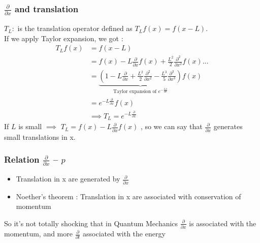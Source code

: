 \documentclass[12pt,oneside]{book}
\begin{document}
\subsubsection{$\frac{\partial }{\partial x}$ and translation}
$T_L :$ is the translation operator defined as $T_Lf(x) = f(x-L)$.\\
If we apply Taylor expansion, we got :\\
\begin{align*}
	T_Lf(x) & = f(x-L)                                                                                                                                                                                                        \\
	        & =f(x) - L\frac{\partial}{\partial x}f(x)+ \frac{L^2}{2}\frac{\partial^2}{\partial x^2}f(x)...                                                                                                                   \\
	        & =\underbrace{(1-L\frac{\partial}{\partial x} + \frac{L^2}{2}\frac{\partial^2}{\partial x^2} - \frac{L^3}{5}\frac{\partial^3}{\partial x^3})}_\text{Taylor expansion of $e^{-\frac{L\partial}{\partial x}}$}f(x) \\
	        & =e^{-L\frac{\partial}{\partial x}}f(x)                                                                                                                                                                          \\
	        & \implies T_L = e^{-L\frac{\partial}{\partial x}}
\end{align*}
If $L$ is small $\implies$ $T_L = f(x) - L \frac{\partial}{\partial x}f(x)$ , so we can say that $\frac{\partial}{\partial x}$ generates small translations in x.
\subsubsection{Relation $\frac{\partial}{\partial x}$ -- $p$}
\begin{itemize}
	\item Translation in x are generated by $\frac{\partial}{\partial x}$
	\item Noether's theorem : Translation in x are associated with conservation of momentum
\end{itemize}
\begin{center}
	So it's not totally shocking that in Quantum Mechanics $\frac{\partial}{\partial x}$ is associated with the momentum,  and more $\frac{\partial}{\partial t} $ associated with the energy
\end{center}
\end{document}
